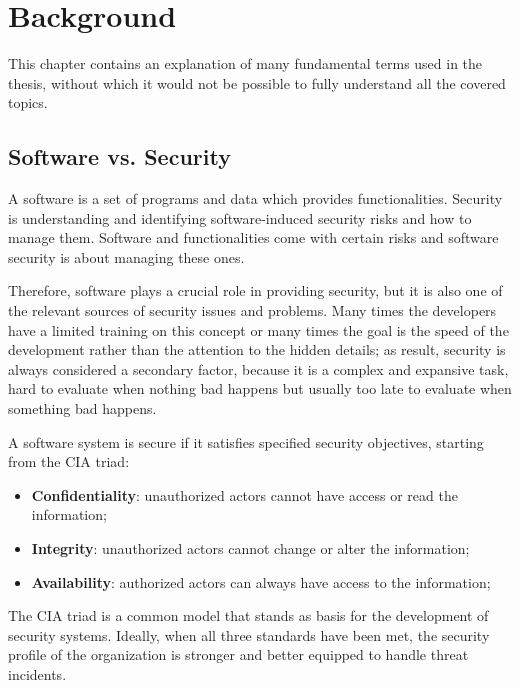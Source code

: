\chapter{Background}
\label{cha:background}


This chapter contains an explanation of many fundamental terms used in the thesis, without which it would not be possible to fully understand all the covered topics.

\section{Software vs. Security}

A software is a set of programs and data which provides functionalities. Security is understanding and identifying software-induced security risks and how to manage them. Software and functionalities come with certain risks and software security is about managing these ones.

Therefore, software plays a crucial role in providing security, but it is also one of the relevant sources of security issues and problems. Many times the developers have a limited training on this concept or many times the goal is the speed of the development rather than the attention to the hidden details; as result, security is always considered a secondary factor, because it is a complex and expansive task, hard to evaluate when nothing bad happens but usually too late to evaluate when something bad happens.~\cite{st-slides}

A software system is secure if it satisfies specified security objectives, starting from the CIA triad:
\begin{itemize}
  \item \textbf{Confidentiality}: unauthorized actors cannot have access or read the information;
  \item \textbf{Integrity}: unauthorized actors cannot change or alter the information;
  \item \textbf{Availability}: authorized actors can always have access to the information;
\end{itemize}
The CIA triad is a common model that stands as basis for the development of security systems.
Ideally, when all three standards have been met, the security profile of the organization is stronger and better equipped to handle threat incidents.~\cite{cia-triad}

